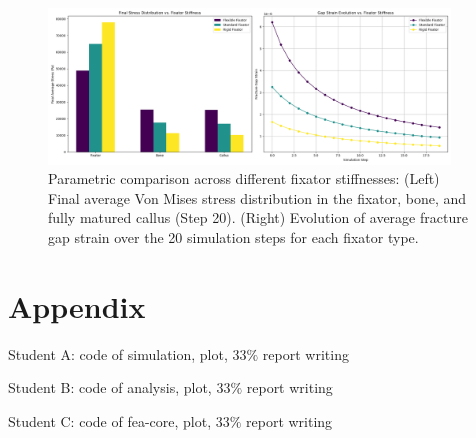\documentclass{article}
\begin{document}
\begin{figure}[H]
  \centering
  \includegraphics[width=0.95\textwidth]{../output_advanced/parametric_comparison.png}
  \caption{Parametric comparison across different fixator stiffnesses: (Left) Final average Von Mises stress distribution in the fixator, bone, and fully matured callus (Step 20). (Right) Evolution of average fracture gap strain over the 20 simulation steps for each fixator type.}
  \label{fig:parametric_comparison}
\end{figure}

\section{Appendix}

Student A: code of simulation, plot, 33$\%$ report writing

Student B: code of analysis, plot, 33$\%$ report writing

Student C: code of fea-core, plot, 33$\%$ report writing







\end{document}
